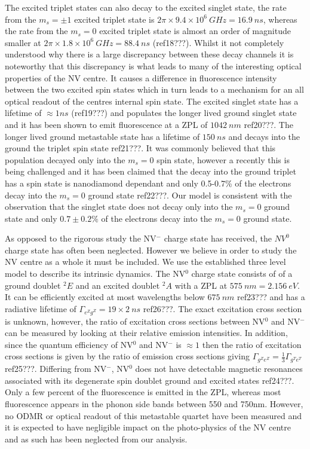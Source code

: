 \documentclass[prl]{revtex4}
\begin{document}
The excited triplet states can also decay to the excited singlet state, the rate from the $m_s=\pm1$ excited triplet state is $2\pi\times9.4\times10^6\SI{}{GHz} = \SI{16.9}{ns}$, whereas the rate from the $m_s=0$ excited triplet state is almost an order of magnitude smaller at $ 2\pi\times1.8\times10^6 \SI{}{GHz} = \SI{88.4}{ns}$ (ref18???). Whilst it not completely understood why there is a large discrepancy between these decay channels it is noteworthy that this discrepancy is what leads to many of the interesting optical properties of the NV centre. It causes a difference in fluorescence intensity between the two excited spin states which in turn leads to a mechanism for an all optical readout of the centres internal spin state. The excited singlet state has a lifetime of $\approx\si{1}{ns}$ (ref19???) and populates the longer lived ground singlet state and it has been shown to emit fluorescence at a ZPL of $\SI{1042}{nm}$ ref20???. The longer lived ground metastable state has a lifetime of $\SI{150}{ns}$ and decays into the ground the triplet spin state ref21???. It was commonly believed that this population decayed only into the $m_s=0$ spin state, however a recently this is being challenged and it has been claimed that the decay into the ground triplet has a spin state is nanodiamond dependant and only 0.5-0.7\% of the electrons decay into the $m_s=0$ ground state ref22???. Our model is consistent with the observation that the singlet state does not decay only into the $m_s=0$ ground state and only $0.7 \pm 0.2\%$ of the electrons decay into the $m_s=0$ ground state.

As opposed to the rigorous study the NV$^-$ charge state has received, the $NV^0$ charge state has often been neglected. However we believe in order to study the NV centre as a whole it must be included. We use the established three level model to describe its intrinsic dynamics. The NV$^0$ charge state consists of of a ground doublet $^2E$ and an excited doublet $^2A$ with a ZPL at $\SI{575}{nm} = \SI{2.156}{eV}$.  It can be efficiently excited at most wavelengths below $\SI{675}{nm}$ ref23??? and has a radiative lifetime of $\Gamma_{e^Zg^Z} = 19\times2 \SI{}{ns}$ ref26???. The exact excitation cross section is unknown, however, the ratio of excitation cross sections between NV$^0$ and NV$^-$ can be measured by looking at their relative emission intensities. In addition, since the quantum efficiency of NV$^0$ and NV$^-$ is $\approx 1$ then the ratio of excitation cross sections is given by the ratio of emission cross sections giving $\Gamma_{g^Ze^Z} = \frac{1}{3} \Gamma_{g^Te^T}$ ref25???. Differing from NV$^-$, NV$^0$ does not have detectable magnetic resonances associated with its degenerate spin doublet ground and excited states ref24???. Only a few percent of the fluorescence is emitted in the ZPL, whereas most fluorescence appears in the phonon side bands between 550 and 750nm. However, no ODMR or optical readout of this metastable quartet have been measured and it is expected to have negligible impact on the photo-physics of the NV centre and as such has been neglected from our analysis. 
\end{document}
